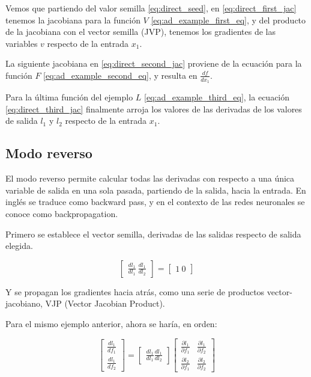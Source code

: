 Vemos que partiendo del valor semilla \eqref{eq:direct_seed}, en
\eqref{eq:direct_first_jac} tenemos la jacobiana para la función $V$
\eqref{eq:ad_example_first_eq}, y del producto de la jacobiana con el vector
semilla (JVP), tenemos los gradientes de las variables $v$ respecto de la entrada
$x_1$.

La siguiente jacobiana en \eqref{eq:direct_second_jac} proviene de la ecuación
para la función $F$ \eqref{eq:ad_example_second_eq}, y resulta en
$\frac{df}{dx_1}$.

Para la última función del ejemplo $L$ \eqref{eq:ad_example_third_eq}, la ecuación
\eqref{eq:direct_third_jac} finalmente arroja los valores de las derivadas de los
valores de salida $l_1$ y $l_2$ respecto de la entrada $x_1$.


\subsection{Modo reverso}

El modo reverso permite calcular todas las derivadas con respecto a una única
variable de salida en una sola pasada, partiendo de la salida, hacia la
entrada. En inglés se traduce como backward pass, y en el contexto de las redes
neuronales se conoce como backpropagation.

Primero se establece el vector semilla, derivadas de las salidas respecto de
salida elegida.

\begin{equation}
	\begin{bmatrix}
		\frac{dl_1}{dl_1} \
		\frac{dl_1}{dl_2}
	\end{bmatrix}
	=
	\begin{bmatrix}
		1 \
		0
	\end{bmatrix}
\end{equation}

Y se propagan los gradientes hacia atrás, como una serie de productos
vector-jacobiano, VJP (Vector Jacobian Product).

Para el mismo ejemplo anterior, ahora se haría, en orden:

\begin{equation}
	\begin{bmatrix}
		\frac{dl_1}{df_1} \\
		\frac{dl_1}{df_2}
	\end{bmatrix}
	=
	\begin{bmatrix}
		\frac{dl_1}{dl_1}
		\frac{dl_1}{dl_2}
	\end{bmatrix}
	\begin{bmatrix}
		\frac{\partial l_1}{\partial f_1} & \frac{\partial l_1}{\partial f_2} \\
		\frac{\partial l_2}{\partial f_1} & \frac{\partial l_2}{\partial f_2}
	\end{bmatrix}
\end{equation}

